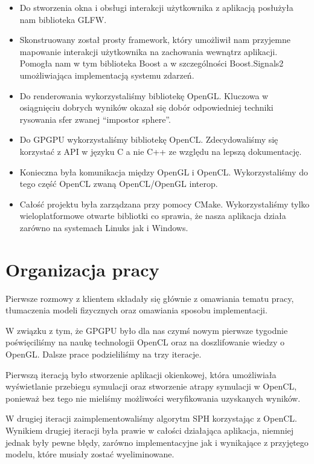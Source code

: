 \documentclass[polish, 12pt]{aghthesis}
\begin{document}
	\begin{itemize}
		\item Do stworzenia okna i obsługi interakcji użytkownika z aplikacją posłużyła nam biblioteka GLFW.
		\item Skonstruowany został prosty framework, który umożliwił nam przyjemne mapowanie interakcji użytkownika na zachowania wewnątrz aplikacji. Pomogła nam w tym biblioteka Boost a w szczególności Boost.Signals2 umożliwiająca implementacją systemu zdarzeń.
		\item Do renderowania wykorzystaliśmy bibliotekę OpenGL. Kluczowa w osiągnięciu dobrych wyników okazał się dobór odpowiedniej techniki rysowania sfer zwanej “impostor sphere”.
		\item Do GPGPU wykorzystaliśmy bibliotekę OpenCL. Zdecydowaliśmy się korzystać z API w języku C a nie C++ ze względu na lepszą dokumentację.
		\item Konieczna była komunikacja między OpenGL i OpenCL. Wykorzystaliśmy do tego część OpenCL zwaną OpenCL/OpenGL interop.
		\item Całość projektu była zarządzana przy pomocy CMake. Wykorzystaliśmy tylko wieloplatformowe otwarte bibliotki co sprawia, że nasza aplikacja działa zarówno na systemach Linuks jak i Windows.
	\end{itemize}

\section{Organizacja pracy}

	Pierwsze rozmowy z klientem składały się głównie z omawiania tematu pracy, tłumaczenia modeli fizycznych oraz omawiania sposobu implementacji. 

	W związku z tym, że GPGPU było dla nas czymś nowym pierwsze tygodnie poświęciliśmy na naukę technologii OpenCL oraz na doszlifowanie wiedzy o OpenGL. Dalsze prace podzieliliśmy na trzy iteracje.

	Pierwszą iteracją było stworzenie aplikacji okienkowej, która umożliwiała wyświetlanie przebiegu symulacji oraz stworzenie atrapy symulacji w OpenCL, ponieważ bez tego nie mieliśmy możliwości weryfikowania uzyskanych wyników.

	W drugiej iteracji zaimplementowaliśmy algorytm SPH korzystając z OpenCL. Wynikiem drugiej iteracji była prawie w całości działająca aplikacja, niemniej jednak były pewne błędy, zarówno implementacyjne jak i wynikające z przyjętego modelu, które musiały zostać wyeliminowane.
\end{document}
